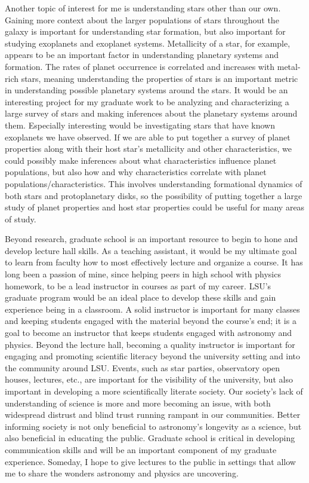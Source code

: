 \documentclass[12pt,letterpaper]{article}
\begin{document}
Another topic of interest for me is understanding stars other than our own. Gaining more context about the larger populations of stars throughout the galaxy is important for understanding star formation, but also important for studying exoplanets and exoplanet systems. Metallicity of a star, for example, appears to be an important factor in understanding planetary systems and formation. The rates of planet occurrence is correlated and increases with metal-rich stars, meaning understanding the properties of stars is an important metric in understanding possible planetary systems around the stars. It would be an interesting project for my graduate work to be analyzing and characterizing a large survey of stars and making inferences about the planetary systems around them. Especially interesting would be investigating stars that have known exoplanets we have observed. If we are able to put together a survey of planet properties along with their host star's metallicity and other characteristics, we could possibly make inferences about what characteristics influence planet populations, but also how and why characteristics correlate with planet populations/characteristics. This involves understanding formational dynamics of both stars and protoplanetary disks, so the possibility of putting together a large study of planet properties and host star properties could be useful for many areas of study. 

Beyond research, graduate school is an important resource to begin to hone and develop lecture hall skills. As a teaching assistant, it would be my ultimate goal to learn from faculty how to most effectively lecture and organize a course. It has long been a passion of mine, since helping peers in high school with physics homework, to be a lead instructor in courses as part of my career. LSU's graduate program would be an ideal place to develop these skills and gain experience being in a classroom. A solid instructor is important for many classes and keeping students engaged with the material beyond the course's end; it is a goal to become an instructor that keeps students engaged with astronomy and physics. Beyond the lecture hall, becoming a quality instructor is important for engaging and promoting scientific literacy beyond the university setting and into the community around LSU. Events, such as star parties, observatory open houses, lectures, etc., are important for the visibility of the university, but also important in developing a more scientifically literate society. Our society's lack of understanding of science is more and more becoming an issue, with both widespread distrust and blind trust running rampant in our communities. Better informing society is not only beneficial to astronomy's longevity as a science, but also beneficial in educating the public. Graduate school is critical in developing communication skills and will be an important component of my graduate experience. Someday, I hope to give lectures to the public in settings that allow me to share the wonders astronomy and physics are uncovering. 
\end{document}
